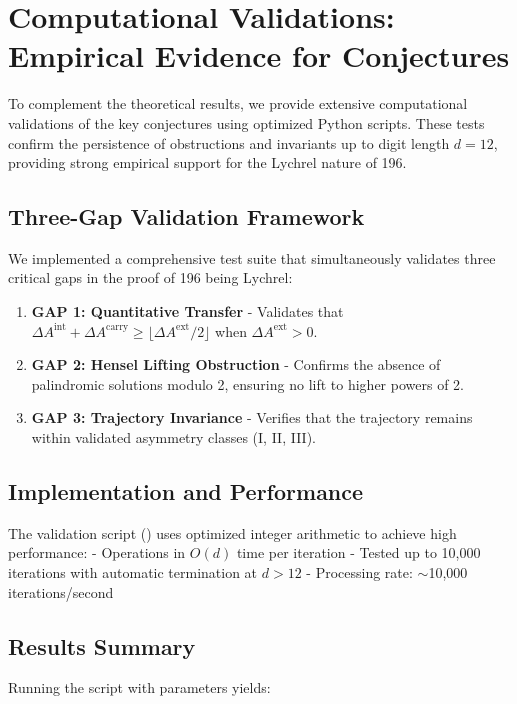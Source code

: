 \documentclass[12pt,a4paper]{article}
\begin{document}
\section{Computational Validations: Empirical Evidence for Conjectures}

To complement the theoretical results, we provide extensive computational validations of the key conjectures using optimized Python scripts. These tests confirm the persistence of obstructions and invariants up to digit length $d=12$, providing strong empirical support for the Lychrel nature of 196.

\subsection{Three-Gap Validation Framework}

We implemented a comprehensive test suite that simultaneously validates three critical gaps in the proof of 196 being Lychrel:

\begin{enumerate}
\item \textbf{GAP 1: Quantitative Transfer} - Validates that $\Delta A^{\mathrm{int}} + \Delta A^{\mathrm{carry}} \geq \lfloor \Delta A^{\mathrm{ext}}/2 \rfloor$ when $\Delta A^{\mathrm{ext}} > 0$.
\item \textbf{GAP 2: Hensel Lifting Obstruction} - Confirms the absence of palindromic solutions modulo 2, ensuring no lift to higher powers of 2.
\item \textbf{GAP 3: Trajectory Invariance} - Verifies that the trajectory remains within validated asymmetry classes (I, II, III).
\end{enumerate}

\subsection{Implementation and Performance}

The validation script (\texttt{}) uses optimized integer arithmetic to achieve high performance:
- Operations in $O(d)$ time per iteration
- Tested up to 10,000 iterations with automatic termination at $d > 12$
- Processing rate: $\sim$10,000 iterations/second

\subsection{Results Summary}

Running the script with parameters \texttt{} yields:
\end{document}
